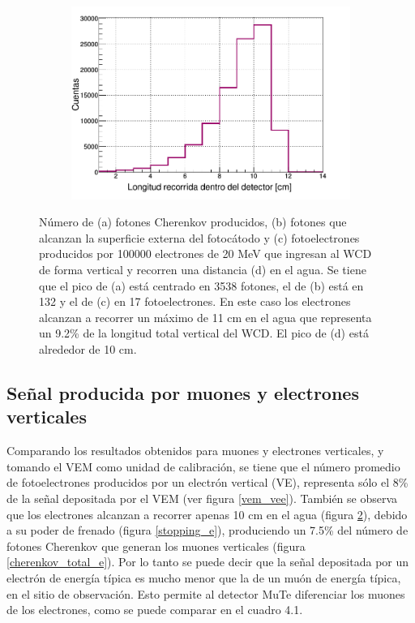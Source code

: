 \documentclass[12pt,oneside,openany,letter]{book}
\begin{document}
\begin{figure}[h!]
\begin{subfigure}{0.45\textwidth}
        \caption{}
        \label{fotoelectrones_vee}
    \end{subfigure}
    \begin{subfigure}{0.45\textwidth}
        \includegraphics[width=\textwidth]{images/distancia_vee.png}
        \caption{}
        \label{distancia_vee}
    \end{subfigure}
    \caption[Número de fotones Cherenkov producidos en el WCD, fotones que alcanzan la superficie externa del fotoc\'atodo del PMT y fotoelectrones generados por electrones verticales de 20 MeV]{Número de (a) fotones Cherenkov producidos, (b) fotones que alcanzan la superficie externa del fotoc\'atodo y (c) fotoelectrones producidos por 100000 electrones de 20 MeV que ingresan al WCD de forma vertical y recorren una distancia (d) en el agua. Se tiene que el pico de (a) está centrado en 3538 fotones, el de (b) está en 132 y el de (c) en 17 fotoelectrones. En este caso los electrones alcanzan a recorrer un máximo de 11 cm en el agua que representa un 9.2\% de la longitud total vertical del WCD. El pico de (d) está alrededor de 10 cm.}\label{VE_plots}
\end{figure}


\subsection{Señal producida por muones y electrones verticales} 
Comparando los resultados obtenidos para muones y electrones verticales, y tomando el VEM como unidad de calibración, se tiene que el número promedio de fotoelectrones producidos por un electrón vertical (VE), representa sólo el 8\% de la señal depositada por el VEM (ver figura \ref{vem_vee}). También se observa que los electrones alcanzan a recorrer apenas 10 cm en el agua (figura \ref{distancia_vee}), debido a su poder de frenado (figura \ref{stopping_e}), produciendo un 7.5\% del número de fotones Cherenkov que generan los muones verticales (figura \ref{cherenkov_total_e}). Por lo tanto se puede decir que la señal depositada por un electrón de energía típica es mucho menor que la de un muón de energía típica, en el sitio de observación. Esto permite al detector MuTe diferenciar los muones de los electrones, como se puede comparar en el cuadro 4.1.
\end{document}
